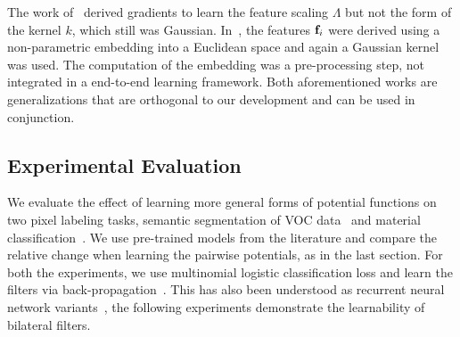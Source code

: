The work of~\cite{krahenbuhl2013parameter} derived gradients to learn the feature scaling $\Lambda$ but not the
form of the kernel $k$, which still was Gaussian. In~\cite{campbell2013fully}, the features $\mathbf{f}_i$ were
derived using a non-parametric embedding into a Euclidean space and again a Gaussian
kernel was used. The computation of the embedding was a pre-processing step, not integrated in a
end-to-end learning framework. Both aforementioned works are generalizations that are orthogonal
to our development and can be used in conjunction.

\subsection{Experimental Evaluation}

We evaluate the effect of learning more general forms of potential functions on two
pixel labeling tasks, semantic segmentation of VOC data~\cite{voc2012segmentation} and material
classification~\cite{bell2015minc}. We use pre-trained models from the literature
and compare the relative change when learning the pairwise potentials, as in the last section. For both
the experiments, we use multinomial logistic classification loss and learn the filters via
back-propagation~\cite{domke2013learning}. This has also been understood as recurrent neural
network variants~\cite{zheng2015conditional},
the following experiments demonstrate the learnability of bilateral filters.

\begin{figure}[t]
  \centering
  \\
  \setcounter{subfigure}{0}
    \label{fig:seg_visuals}
\end{figure}

